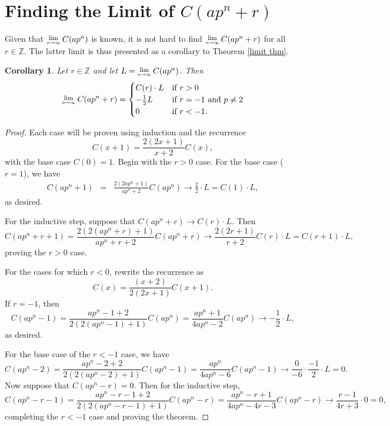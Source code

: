 \documentclass[12pt, letter]{article}    %
\theoremstyle{plain}
\newtheorem{corollary}[theorem]{Corollary}
\theoremstyle{definition}
\numberwithin{equation}{section}
\newcommand{\Lim}[1]{\raisebox{0.5ex}{\scalebox{0.8}{$\displaystyle \lim_{#1}\;$}}}
\newcommand{\thref}[1]{Theorem \ref{#1}}
\newcommand{\thlabel}[1]{\label{#1}}
\begin{document}
\section{Finding the Limit of $C(ap^n+r)$}


Given that $\Lim{n\rightarrow\infty}C(ap^n)$ is known, it is not hard to find $\Lim{n\rightarrow\infty}C(ap^n+r)$ for all $r\in\mathbb{Z}$. The latter limit is thus presented as a corollary to \thref{limit thm}.

\begin{corollary}\thlabel{limit cor}Let $r\in\mathbb{Z}$ and let $L=\Lim{n\rightarrow\infty}C(ap^n)$. Then
$$\Lim{n\rightarrow\infty}C(ap^n+r)=\begin{cases}
C(r)\cdot L & \mbox{if }r>0\\
-\frac{1}{2}L & \mbox{if } r=-1 \text{ and } p\neq 2\\
0 & \mbox{if } r<-1.
\end{cases}$$
\end{corollary}

\begin{proof}
Each case will be proven using induction and the recurrence $$C(x+1)=\frac{2(2x+1)}{x+2}C(x),$$ with the base case $C(0)=1$.
Begin with the $r>0$ case. For the base case ($r=1$), we have
\begin{eqnarray*}
C(ap^n+1)&=&\frac{2(2ap^n+1)}{ap^n+2}C(ap^n)
\rightarrow \frac{2}{2}\cdot L=C(1)\cdot L,
\end{eqnarray*}
as desired.

For the inductive step, suppose that $C(ap^n+r)\rightarrow C(r)\cdot L.$ Then $$C(ap^n+r+1)=\frac{2(2(ap^n+r)+1)}{ap^n+r+2}C(ap^n+r)\rightarrow \frac{2(2r+1)}{r+2}C(r)\cdot L=C(r+1)\cdot L,$$
proving the $r>0$ case.

For the cases for which $r<0$, rewrite the recurrence as $$C(x)=\frac{(x+2)}{2(2x+1)}C(x+1).$$
If $r=-1$, then
$$C(ap^n-1)=\frac{ap^n-1+2}{2(2(ap^n-1)+1)}C(ap^n)=\frac{ap^n+1}{4ap^n-2}C(ap^n)\rightarrow -\frac{1}{2}\cdot L,$$ as desired.

For the base case of the $r<-1$ case, we have
$$C(ap^n-2)=\frac{ap^n-2+2}{2(2(ap^n-2)+1)}C(ap^n-1)=\frac{ap^n}{4ap^n-6}C(ap^n-1)\rightarrow\frac{0}{-6}\cdot\frac{-1}{2}\cdot L=0.$$
Now suppose that $C(ap^n-r)=0$. Then for the inductive step,
$$C(ap^n-r-1)=\frac{ap^n-r-1+2}{2(2(ap^n-r-1)+1)}C(ap^n-r)=\frac{ap^n-r+1}{4ap^n-4r-3}C(ap^n-r)\rightarrow\frac{r-1}{4r+3}\cdot 0=0,$$
completing the $r<-1$ case and proving the theorem. \end{proof}
\end{document}
